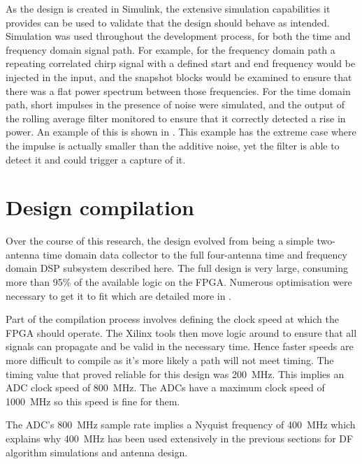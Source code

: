 As the design is created in Simulink, the extensive simulation capabilities it provides can be used to validate that the design should behave as intended. Simulation was used throughout the development process, for both the time and frequency domain signal path. For example, for the frequency domain path a repeating correlated chirp signal with a defined start and end frequency would be injected in the input, and the snapshot blocks would be examined to ensure that there was a flat power spectrum between those frequencies. For the time domain path, short impulses in the presence of noise were simulated, and the output of the rolling average filter monitored to ensure that it correctly detected a rise in power. An example of this is shown in . This example has the extreme case where the impulse is actually smaller than the additive noise, yet the filter is able to detect it and could trigger a capture of it.

\section{Design compilation}
Over the course of this research, the design evolved from being a simple two-antenna time domain data collector to the full four-antenna time and frequency domain DSP subsystem described here. The full design is very large, consuming more than 95\% of the available logic on the FPGA. Numerous optimisation were necessary to get it to fit which are detailed more in .

Part of the compilation process involves defining the clock speed at which the FPGA should operate. The Xilinx tools then move logic around to ensure that all signals can propagate and be valid in the necessary time. Hence faster speeds are more difficult to compile as it's more likely a path will not meet timing. The timing value that proved reliable for this design was \SI{200}{\mega\hertz}. This implies an ADC clock speed of \SI{800}{\mega\hertz}. The ADCs have a maximum clock speed of \SI{1000}{\mega\hertz} so this speed is fine for them. 

The ADC's \SI{800}{\mega\hertz} sample rate implies a Nyquist frequency of \SI{400}{\mega\hertz} which explains why \SI{400}{\mega\hertz} has been used extensively in the previous sections for DF algorithm simulations and antenna design.



